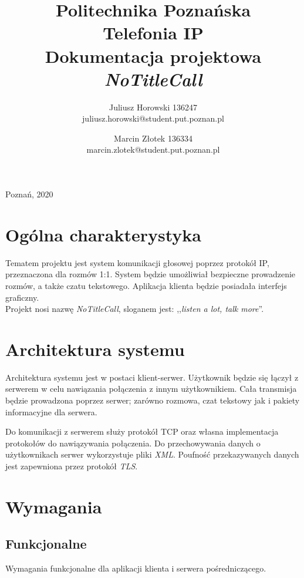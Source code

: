 \documentclass[12pt,a4paper]{article}
\title{\Large Politechnika Poznańska \vspace{3cm}\\ \textbf{\LARGE {Telefonia IP}}\\ \vspace{0.7cm} Dokumentacja projektowa \\ \vspace{0.2cm} \textit{NoTitleCall} }
\author{Juliusz Horowski 136247 \\ juliusz.horowski@student.put.poznan.pl \and Marcin Złotek 136334 \\ marcin.zlotek@student.put.poznan.pl }
\date{}
\begin{document}
	\begin{titlepage}
		
		\clearpage
		
		\maketitle
		
		\thispagestyle{empty}
		\vfill
		\begin{center}
			\large Poznań, 2020
		\end{center}
	\end{titlepage}

	\tableofcontents
	\newpage
	
	\section{Ogólna charakterystyka}
	\par Tematem projektu jest system komunikacji głosowej poprzez protokół IP, przeznaczona dla rozmów 1:1. System będzie umożliwiał bezpieczne prowadzenie rozmów, a także czatu tekstowego. Aplikacja klienta będzie posiadała interfejs graficzny. \\
	Projekt nosi nazwę \textit{NoTitleCall}, sloganem jest: ,,\textit{listen a lot, talk more}''. %
	
	\section{Architektura systemu}
	\par Architektura systemu jest w postaci klient-serwer. Użytkownik będzie się łączył z serwerem w celu nawiązania połączenia z innym użytkownikiem. Cała transmisja będzie prowadzona poprzez serwer; zarówno rozmowa, czat tekstowy jak i pakiety informacyjne dla serwera. 
	\par Do komunikacji z serwerem służy protokół TCP oraz własna implementacja protokołów do nawiązywania połączenia. Do przechowywania danych o użytkownikach serwer wykorzystuje pliki \textit{XML}. Poufność przekazywanych danych jest zapewniona przez protokół \textit{TLS}.
	
	\section{Wymagania}
	
	\subsection{Funkcjonalne}
	\par Wymagania funkcjonalne dla aplikacji klienta i serwera pośredniczącego.
\end{document}
